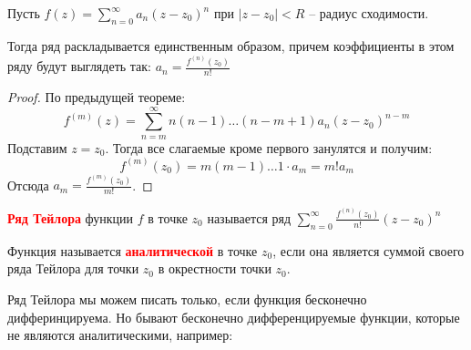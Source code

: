 
\begin{theorem} \thmslashn
	
	Пусть $f(z) = \sum\limits_{n=0}^{\infty} a_n(z - z_0)^n$ при $|z-z_0| < R$ -- радиус сходимости.
	
	Тогда ряд раскладывается единственным образом, причем коэффициенты в этом ряду будут выглядеть так: $a_n = \frac{f^{(n)}(z_0)}{n!}$
	\begin{proof} \thmslashn
	
		По предыдущей теореме:
		\[
		f^{(m)}(z) = \sum\limits_{n=m}^{\infty} n(n-1)\ldots(n-m+1)a_n(z-z_0)^{n-m}
		\]
		Подставим $z = z_0$. Тогда все слагаемые кроме первого занулятся и получим: 
		\[
		f^{(m)}(z_0) = m(m-1)\ldots1\cdot a_m = m!a_m
		\]
		Отсюда $a_m = \frac{f^{(m)}(z_0)}{m!}$.
	\end{proof}
\end{theorem}

\begin{definition} \thmslashn
	
	\textcolor{red}{\textbf{Ряд Тейлора}} функции $f$ в точке $z_0$ называется ряд $\sum\limits_{n=0}^{\infty} \frac{f^{(n)}(z_0)}{n!}(z-z_0)^n$
\end{definition}

\begin{definition} \thmslashn
	
	Функция называется \textcolor{red}{\textbf{аналитической}} в точке $z_0$, если она является суммой своего ряда Тейлора для точки $z_0$ в окрестности точки $z_0$.
\end{definition}

Ряд Тейлора мы можем писать только, если функция бесконечно дифферинцируема. Но бывают бесконечно дифференцируемые функции, которые не являются аналитическими, например:

